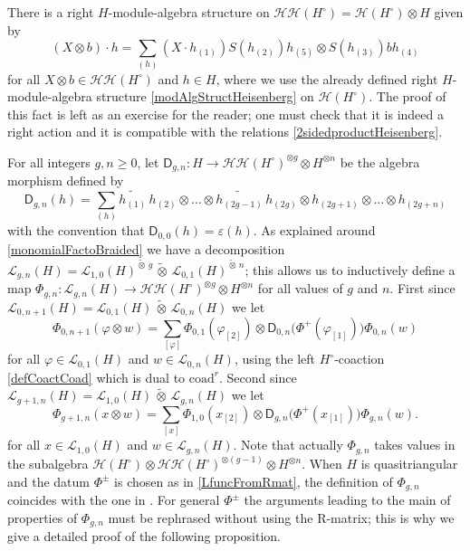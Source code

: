 \documentclass[11pt]{amsart}
\begin{document}
\smallskip

\indent There is a right $H$-module-algebra structure on $\mathcal{HH}(H^\circ) = \mathcal{H}(H^\circ) \otimes H$ given by
\begin{equation}\label{modAlgStructTwoSidedHeis}
(X \otimes b) \cdot h = \sum_{(h)} (X \cdot h_{(1)}) S(h_{(2)})h_{(5)} \otimes S(h_{(3)})bh_{(4)}
\end{equation}
for all $X \otimes b \in \mathcal{HH}(H^\circ)$ and $h \in H$, where we use the already defined right $H$-module-algebra structure \eqref{modAlgStructHeisenberg} on $\mathcal{H}(H^\circ)$. The proof of this fact is left as an exercise for the reader; one must check that it is indeed a right action and it is compatible with the relations \eqref{2sidedproductHeisenberg}.

\smallskip

\indent For all integers $g,n \geq 0$, let $\mathsf{D}_{g,n} : H \to \mathcal{HH}(H^\circ)^{\otimes g} \otimes H^{\otimes n}$ be the algebra morphism defined by
\begin{equation}\label{dressingMap}
 \mathsf{D}_{g,n}(h) = \sum_ {(h)} \widetilde{h_{(1)}}\,h_{(2)} \otimes \ldots \otimes \widetilde{h_{(2g-1)}}\,h_{(2g)} \otimes h_ {(2g+1)} \otimes \ldots \otimes h_{(2g+n)}
\end{equation}
with the convention that $\mathsf{D}_{0,0}(h) = \varepsilon(h)$. As explained around \eqref{monomialFactoBraided} we have a decomposition $\mathcal{L}_{g,n}(H) = \mathcal{L}_{1,0}(H)^{\widetilde{\otimes}\,g} \,\widetilde{\otimes}\, \mathcal{L}_{0,1}(H)^{\widetilde{\otimes}\,n}$; this allows us to inductively define a map $\Phi_{g,n} : \mathcal{L}_{g,n}(H) \to \mathcal{HH}(H^\circ)^{\otimes g} \otimes H^{\otimes n}$ for all values of $g$ and $n$. First since $\mathcal{L}_{0,n+1}(H) = \mathcal{L}_{0,1}(H) \,\widetilde{\otimes}\, \mathcal{L}_{0,n}(H)$ we let
\begin{equation}\label{AlekseevValue1}
\Phi_{0,n+1}(\varphi \otimes w) =  \sum_{[\varphi]} \Phi_{0,1}(\varphi_{[2]}) \otimes \mathsf{D}_{0,n}\bigl( \Phi^+(\varphi_{[1]}) \bigr)\Phi_{0,n}(w)
\end{equation}
for all $\varphi \in \mathcal{L}_{0,1}(H)$ and $w \in \mathcal{L}_{0,n}(H)$, using the left $H^\circ$-coaction \eqref{defCoactCoad} which is dual to $\mathrm{coad}^r$. Second since $\mathcal{L}_{g+1,n}(H) = \mathcal{L}_{1,0}(H) \,\widetilde{\otimes}\, \mathcal{L}_{g,n}(H)$ we let
\begin{equation}\label{AlekseevValue2}
\Phi_{g+1,n}(x \otimes w) =  \sum_{[x]} \Phi_{1,0}(x_{[2]}) \otimes \mathsf{D}_{g,n}\bigl( \Phi^+(x_{[1]}) \bigr)\Phi_{g,n}(w).
\end{equation}
for all $x \in \mathcal{L}_{1,0}(H)$ and $w \in \mathcal{L}_{g,n}(H)$. Note that actually $\Phi_{g,n}$ takes values in the subalgebra $\mathcal{H}(H^\circ) \otimes \mathcal{HH}(H^\circ)^{\otimes (g-1)} \otimes H^{\otimes n}$. When $H$ is quasitriangular and the datum $\Phi^{\pm}$ is chosen as in \eqref{LfuncFromRmat}, the definition of $\Phi_{g,n}$ coincides with the one in \cite[\S 5.2]{BFR}. For general $\Phi^\pm$ the arguments leading to the main of properties of $\Phi_{g,n}$ must be rephrased without using the R-matrix; this is why we give a detailed proof of the following proposition.
\end{document}
